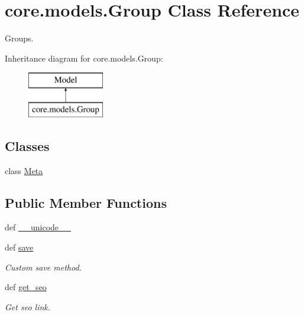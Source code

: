 \hypertarget{classcore_1_1models_1_1Group}{\section{core.\-models.\-Group Class Reference}
\label{classcore_1_1models_1_1Group}
}


Groups.  


Inheritance diagram for core.\-models.\-Group\-:\begin{figure}[H]
\begin{center}
\leavevmode
\includegraphics[height=2.000000cm]{classcore_1_1models_1_1Group}
\end{center}
\end{figure}
\subsection*{Classes}
\begin{DoxyCompactItemize}
\item 
class \hyperlink{classcore_1_1models_1_1Group_1_1Meta}{Meta}
\end{DoxyCompactItemize}
\subsection*{Public Member Functions}
\begin{DoxyCompactItemize}
\item 
def \hyperlink{classcore_1_1models_1_1Group_a8764b5ef1972100111dd0d33c95f417a}{\-\_\-\-\_\-unicode\-\_\-\-\_\-}
\item 
def \hyperlink{classcore_1_1models_1_1Group_ab867392abab3272052c7bce26c5fbea4}{save}
\begin{DoxyCompactList}\small\item\em Custom save method. \end{DoxyCompactList}\item 
def \hyperlink{classcore_1_1models_1_1Group_a0ff6af440da1ef342556e893de28537b}{get\-\_\-seo}
\begin{DoxyCompactList}\small\item\em Get seo link. \end{DoxyCompactList}\end{DoxyCompactItemize}
